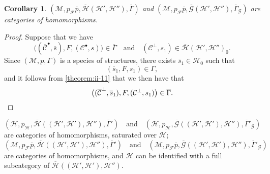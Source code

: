 \documentclass[a4paper,fleqn]{article}
\theoremstyle{plain}
\newenvironment{theorem}[1]
  {\renewcommand\theinnertheorem{#1}\innertheorem}
  {\endinnertheorem}
\newtheorem*{corollary*}{Corollary}
\theoremstyle{definition}
\newcommand{\oldpage}[1]{{\marginpar{\footnotesize$\bigg\vert$\,\,\,\,\textit{p.~#1}}}}
\newcommand{\textand}{\quad\text{and}\quad}
\newcommand{\CC}{\mathcal{C}}
\newcommand{\HH}{\mathcal{H}}
\newcommand{\MM}{\mathcal{M}}
\newcommand{\FF}{\mathcal{F}}
\newcommand{\GG}{\mathcal{G}}
\newcommand{\smallbullet}{\bullet}
\begin{document}
\begin{corollary*}
  $(\MM,p_\FF\overline{p},\overline{\HH}(\HH',\HH''),\overline{\Gamma})$ and $(\MM,p_\FF\overline{p},\overline{\GG}(\HH',\HH''),\overline{\Gamma}_\GG)$ are categories of homomorphisms.
\end{corollary*}

\begin{proof}
  Suppose that we have
  \[
    \big((\overline{\CC}^\smallbullet,\overline{s}),F,(\CC^\smallbullet,s)\big)
    \in\overline{\Gamma}
    \textand
    (\CC^\perp,s_1)
    \in\overline{\HH}(\HH',\HH'')_0.
  \]
  Since $(\MM,p,\Gamma)$ is a species of structures, there exists $\overline{s}_1\in\HH_0$ such that
  \[
    (\overline{s}_1,F,s_1)
    \in\Gamma,
  \]
  and it follows from \cref{theorem:ii-11} that we then have that
  \[
    \big((\overline{\CC}^\perp,\overline{s}_1),F,(\CC^\perp,s_1)\big)
    \in\overline{\Gamma}.
    \qedhere
  \]
\end{proof}

\begin{theorem}{12}
\label{theorem:ii-12}
  \[
    (\HH,\overline{p}_\HH,\overline{\HH}((\HH',\HH'),\HH''),\overline{\Gamma}')
    \textand
    (\HH,\overline{p}_\HH,\overline{\GG}((\HH',\HH'),\HH''),\overline{\Gamma}'_\GG)
  \]
  are categories of homomorphisms, saturated over $\HH$;
  \oldpage{414}
  \[
    (\MM,p_\FF\overline{p},\overline{\HH}((\HH',\HH'),\HH''),\overline{\Gamma}')
    \textand
    (\MM,p_\FF\overline{p},\overline{\GG}((\HH',\HH'),\HH''),\overline{\Gamma}'_\GG)
  \]
  are categories of homomorphisms, and $\HH$ can be identified with a full subcategory of $\overline{\HH}((\HH',\HH'),\HH'')$.
\end{theorem}
\end{document}
